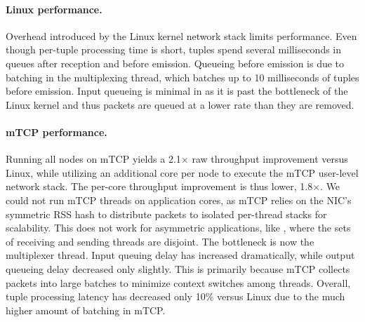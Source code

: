 \paragraph{Linux performance.} Overhead introduced by the Linux kernel
network stack limits \mystorm performance. Even though per-tuple
processing time is short, tuples spend several milliseconds in queues
after reception and before emission. Queueing before emission is due
to batching in the multiplexing thread, which batches up to 10
milliseconds of tuples before emission. Input queueing is minimal in
\mystorm as it is past the bottleneck of the Linux kernel and thus
packets are queued at a lower rate than they are removed.


\paragraph{mTCP performance.} Running all \mystorm nodes on mTCP
yields a 2.1$\times$ raw throughput improvement versus Linux, while
utilizing an additional core per node to execute the mTCP user-level
network stack. The per-core throughput improvement is thus lower,
1.8$\times$. We could not run mTCP threads on application cores, as mTCP relies
on the NIC's symmetric RSS hash to distribute packets to isolated
per-thread stacks for scalability. This does not work for asymmetric
applications, like \mystorm, where the sets of receiving and sending
threads are disjoint. The bottleneck is now the \mystorm multiplexer
thread. Input queuing delay has increased dramatically, while output
queueing delay decreased only slightly. This is primarily because mTCP
collects packets into large batches to minimize context switches among
threads. Overall, tuple processing latency has decreased only 10\%
versus Linux due to the much higher amount of batching in mTCP.

